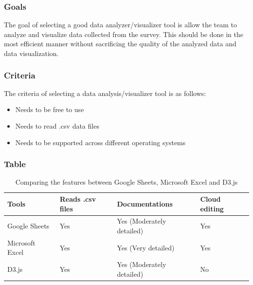 \documentclass[10pt,journal,compsoc,draftclsnofoot]{IEEEtran}
\begin{document}
\subsubsection{Goals}
The goal of selecting a good data analyzer/visualizer tool is allow the team to analyze and visualize data collected from the survey.
This should be done in the most efficient manner without sacrificing the quality of the analyzed data and data visualization.

\subsubsection{Criteria}
The criteria of selecting a data analysis/visualizer tool is as follows:
\begin{itemize}
\item Needs to be free to use
\item Needs to read .csv data files
\item Needs to be supported across different operating systems
\end{itemize}

\subsubsection{Table}
\begin{center}
\begin{table}[H]
\begin{tabular}{ | m{10em} | m{15em} | m{15em} | m{15em} |  } 
\hline
\textbf{Tools}  & \textbf{Reads .csv files } & \textbf{Documentations} & \textbf{Cloud editing} \\ \hline
Google Sheets & Yes  & Yes (Moderately detailed) & Yes \\ \hline
Microsoft Excel & Yes & Yes (Very detailed) & Yes \\ \hline
D3.js & Yes & Yes (Moderately detailed) & No \\ \hline 
\end{tabular}
\newline
\caption{Comparing the features between Google Sheets, Microsoft Excel and D3.js}
\label{table:datatools}
\end{table}
\end{center}

\newpage
\end{document}
